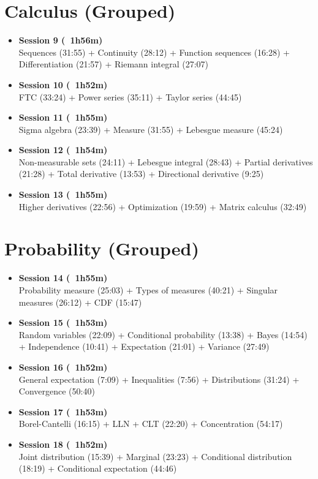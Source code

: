 \documentclass{article}
\begin{document}
\section*{Calculus (Grouped)}

\begin{itemize}
\item \textbf{Session 9 (~1h56m)}\\
Sequences (31:55) + Continuity (28:12) + Function sequences (16:28) + Differentiation (21:57) + Riemann integral (27:07)

\item \textbf{Session 10 (~1h52m)}\\
FTC (33:24) + Power series (35:11) + Taylor series (44:45)

\item \textbf{Session 11 (~1h55m)}\\
Sigma algebra (23:39) + Measure (31:55) + Lebesgue measure (45:24)

\item \textbf{Session 12 (~1h54m)}\\
Non-measurable sets (24:11) + Lebesgue integral (28:43) + Partial derivatives (21:28) + Total derivative (13:53) + Directional derivative (9:25)

\item \textbf{Session 13 (~1h55m)}\\
Higher derivatives (22:56) + Optimization (19:59) + Matrix calculus (32:49)
\end{itemize}

\section*{Probability (Grouped)}

\begin{itemize}
\item \textbf{Session 14 (~1h55m)}\\
Probability measure (25:03) + Types of measures (40:21) + Singular measures (26:12) + CDF (15:47)

\item \textbf{Session 15 (~1h53m)}\\
Random variables (22:09) + Conditional probability (13:38) + Bayes (14:54) + Independence (10:41) + Expectation (21:01) + Variance (27:49)

\item \textbf{Session 16 (~1h52m)}\\
General expectation (7:09) + Inequalities (7:56) + Distributions (31:24) + Convergence (50:40)

\item \textbf{Session 17 (~1h53m)}\\
Borel-Cantelli (16:15) + LLN + CLT (22:20) + Concentration (54:17)

\item \textbf{Session 18 (~1h52m)}\\
Joint distribution (15:39) + Marginal (23:23) + Conditional distribution (18:19) + Conditional expectation (44:46)
\end{itemize}
\end{document}
